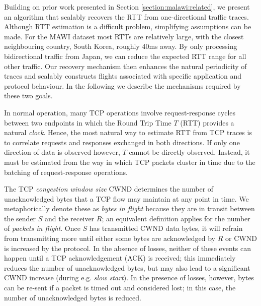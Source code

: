 Building on prior work presented in Section \ref{section:malawi:related}, we present an algorithm that scalably recovers the RTT from one-directional traffic traces. 
Although RTT estimation is a difficult problem, simplifying assumptions
can be made.
For the MAWI dataset most RTTs are relatively large, with the closest neighbouring country, South Korea, roughly 40ms away.
By only processing bidirectional traffic from Japan, we can reduce the expected RTT range for all other traffic.
Our recovery mechanism then enhances the natural periodicity of traces and scalably constructs flights associated with specific application and protocol behaviour.
In the following we describe the mechanisms required by these two goals. 

%
%
In normal operation, many TCP operations involve request-response cycles between two endpoints in which the Round Trip Time $T$ (RTT) provides a natural \emph{clock}. Hence, the most natural way to estimate RTT from TCP traces is to correlate requests and responses exchanged in both directions. If only one direction of data is observed however, $T$ cannot be directly observed. Instead, it must be estimated from the way in which TCP packets cluster in time due to the batching of request-response operations.

The TCP \emph{congestion window size} CWND determines the number of unacknowledged bytes that a TCP flow may maintain at any point in time. We metaphorically denote these as \emph{bytes in flight} because they are in transit between the sender $S$ and the receiver $R$; an equivalent definition applies for the number of \emph{packets in flight}. Once $S$ has transmitted CWND data bytes, it will refrain from transmitting more until either some bytes are acknowledged by $R$ or CWND is increased by the protocol.  In the absence of losses, neither of these events can happen until a TCP acknowledgement (ACK) is received; this immediately reduces the number of unacknowledged bytes, but may also lead to a significant CWND increase (during e.g. \emph{slow start}). 
In the presence of losses, however, bytes can be re-sent if a packet is timed out and considered lost; in this case, the number of unacknowledged bytes is reduced.

